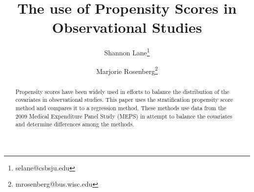 \documentclass[11pt,twocolumn]{article}
\title{The use of Propensity Scores in Observational Studies}
\author[1]{Shannon Lane\thanks{selane@csbsju.edu}}
\author[2]{Marjorie Rosenberg\thanks{mrosenberg@bus.wisc.edu}}
\affil[1]{College of St. Benedict}
\affil[2]{University of Wisconsin-Madison}
\begin{document}
 
\maketitle
\begin{abstract}
\noindent Propensity scores have been widely used in efforts to balance the distribution of the covariates in observational studies. This paper uses \citep{finkelstein2008lifetime} \citep{R}the stratification propensity score method and compares it to a regression method. These methods use data from the 2009 Medical Expenditure Panel Study (MEPS) in attempt to balance the covariates and determine differences among the methods.
\end{abstract}
 
 
\maketitle
\end{document}
